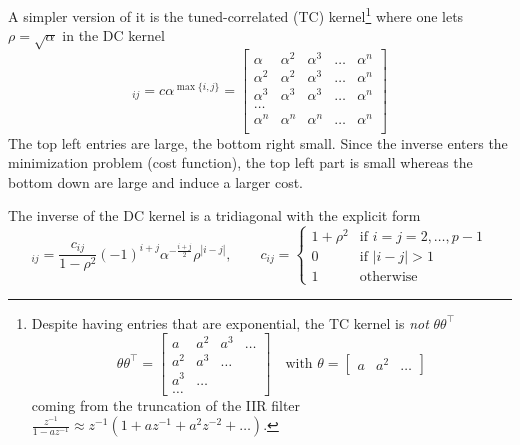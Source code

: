 A simpler version of it is the tuned-correlated (TC) kernel\footnote{Despite having entries that are exponential, the TC kernel is \emph{not} $\theta \theta^\top$
  \begin{equation*}
    \theta \theta^\top =
    \begin{bmatrix}
      a & a^2 & a^3 & \ldots \\
      a^2 & a^3 & \ldots \\
      a^3 & \ldots \\
      \ldots
    \end{bmatrix}\hspace{1em} \textrm{with } \theta =
    \begin{bmatrix}
      a & a^2 & \ldots
    \end{bmatrix}
  \end{equation*}
  coming from the truncation of the IIR filter $\tfrac{z^{-1}}{1-az^{-1}} \approx z^{-1}(1+az^{-1}+a^2z^{-2}+\ldots)$.} where one lets $\rho = \sqrt{\alpha}$ in the DC kernel
\begin{equation*}
  [P]_{ij} = c\alpha^{\max\{i,j\}} =
  \begin{bmatrix}
    \alpha   & \alpha^2 & \alpha^3 & \ldots & \alpha^n \\
    \alpha^2 & \alpha^2 & \alpha^3 & \ldots & \alpha^n \\
    \alpha^3 & \alpha^3 & \alpha^3 & \ldots & \alpha^n \\
    \ldots \\
    \alpha^n & \alpha^n & \alpha^n & \ldots & \alpha^n \\
  \end{bmatrix}
\end{equation*}
The top left entries are large, the bottom right small. Since the inverse enters the minimization problem (cost function), the top left part is small whereas the bottom down are large and induce a larger cost.

The inverse of the DC kernel is a tridiagonal with the explicit form
\begin{equation*}
  [P^{-1}]_{ij} = \frac{c_{ij}}{1-\rho^2}(-1)^{i+j}\alpha^{-\frac{i+j}{2}}\rho^{|i-j|},\hspace{2em} c_{ij} =
  \begin{cases}
    1 + \rho^2 & \textrm{if } i=j=2,\ldots,p-1 \\
    0 & \textrm{if } |i-j| > 1 \\
    1 & \textrm{otherwise}
  \end{cases}
\end{equation*}

